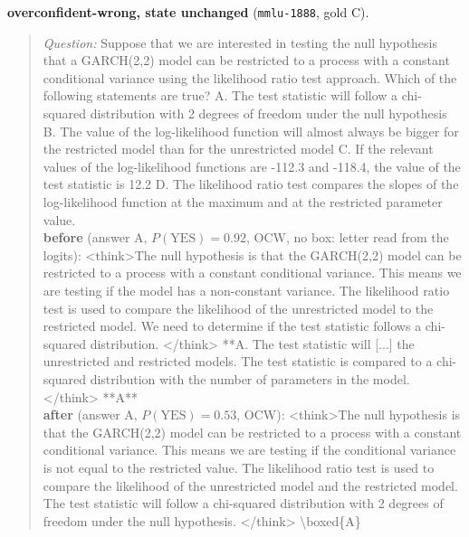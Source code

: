 \noindent\textbf{overconfident-wrong, state unchanged} (\texttt{mmlu-1888}, gold C).
\begin{quote}\scriptsize\emph{Question:} Suppose that we are interested in testing the null hypothesis that a GARCH(2,2) model can be restricted to a process with a constant conditional variance using the likelihood ratio test approach. Which of the following statements are true? A. The test statistic will follow a chi-squared distribution with 2 degrees of freedom under the null hypothesis B. The value of the log-likelihood function will almost always be bigger for the restricted model than for the unrestricted model C. If the relevant values of the log-likelihood functions are -112.3 and -118.4, the value of the test statistic is 12.2 D. The likelihood ratio test compares the slopes of the log-likelihood function at the maximum and at the restricted parameter value.\\[2pt]
\textbf{before} (answer A, $P(\mathrm{YES})=0.92$, OCW, no box: letter read from the logits): {\ttfamily \textless{}think\textgreater{}The null hypothesis is that the GARCH(2,2) model can be restricted to a process with a constant conditional variance. This means we are testing if the model has a non-constant variance. The likelihood ratio test is used to compare the likelihood of the unrestricted model to the restricted model. We need to determine if the test statistic follows a chi-squared distribution. \textless{}/think\textgreater{} **A. The test statistic will [...] the unrestricted and restricted models. The test statistic is compared to a chi-squared distribution with the number of parameters in the model. \textless{}/think\textgreater{} **A**}\\[2pt]
\textbf{after} (answer A, $P(\mathrm{YES})=0.53$, OCW): {\ttfamily \textless{}think\textgreater{}The null hypothesis is that the GARCH(2,2) model can be restricted to a process with a constant conditional variance. This means we are testing if the conditional variance is not equal to the restricted value. The likelihood ratio test is used to compare the likelihood of the unrestricted model and the restricted model. The test statistic will follow a chi-squared distribution with 2 degrees of freedom under the null hypothesis. \textless{}/think\textgreater{} \textbackslash{}boxed\{A\}}
\end{quote}

